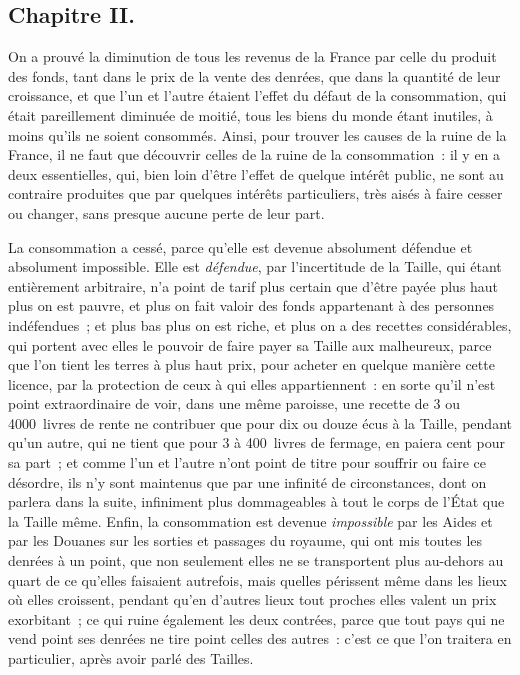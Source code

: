 \documentclass[french,twoside]{book} %
\begin{document}
\subsection[{Chapitre II.}]{Chapitre II.}
\noindent On a prouvé la diminution de tous les revenus de la France par celle du produit des fonds, tant dans le prix de la vente des denrées, que dans la quantité de leur croissance, et que l’un et l’autre étaient l’effet du défaut de la consommation, qui était pareillement diminuée de moitié, tous les biens du monde étant inutiles, à moins qu’ils ne soient consommés. Ainsi, pour trouver les causes de la ruine de la France, il ne faut que découvrir celles de la ruine de la consommation : il y en a deux essentielles, qui, bien loin d’être l’effet de quelque intérêt public, ne sont au contraire produites que par quelques intérêts particuliers, très aisés à faire cesser ou changer, sans presque aucune perte de leur part.\par
La consommation a cessé, parce qu’elle est devenue absolument défendue et absolument impossible. Elle est {\itshape défendue}, par l’incertitude de la Taille, qui étant entièrement arbitraire, n’a point de tarif plus certain que d’être payée plus haut plus on est pauvre, et plus on fait valoir des fonds appartenant à des personnes indéfendues ; et plus bas plus on est riche, et plus on a des recettes considérables, qui portent avec elles le pouvoir de faire payer sa Taille aux malheureux, parce que l’on tient les terres à plus haut prix, pour acheter en quelque manière cette licence, par la protection de ceux à qui elles appartiennent : en sorte qu’il n’est point extraordinaire de voir, dans une même paroisse, une recette de 3 ou 4000 livres de rente ne contribuer que pour dix ou douze écus à la Taille, pendant qu’un autre, qui ne tient que pour 3 à 400 livres de fermage, en paiera cent pour sa part ; et comme l’un et l’autre n’ont point de titre pour souffrir ou faire ce désordre, ils n’y sont maintenus que par une infinité de circonstances, dont on parlera dans la suite, infiniment plus dommageables à tout le corps de l’État que la Taille même. Enfin, la consommation est devenue {\itshape impossible} par les Aides et par les Douanes sur les sorties et passages du royaume, qui ont mis toutes les denrées à un point, que non seulement elles ne se transportent plus au-dehors au quart de ce qu’elles faisaient autrefois, mais quelles périssent même dans les lieux où elles croissent, pendant qu’en d’autres lieux tout proches elles valent un prix exorbitant ; ce qui ruine également les deux contrées, parce que tout pays qui ne vend point ses denrées ne tire point celles des autres : c’est ce que l’on traitera en particulier, après avoir parlé des Tailles.
\end{document}
